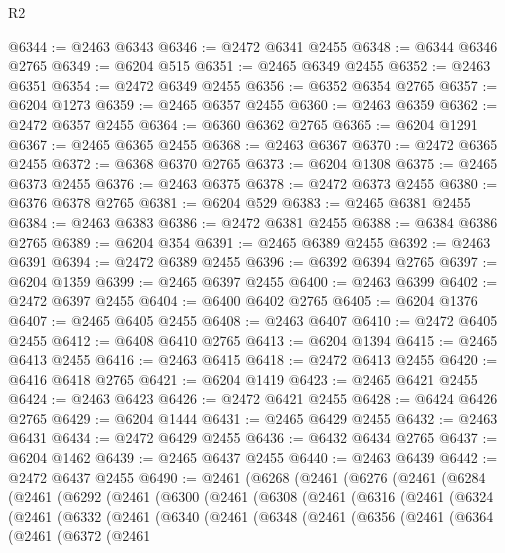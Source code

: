 \begin{lexlean}{R2}
\begin{coremodule}
@6344 := @2463 @6343
@6346 := @2472 @6341 @2455
@6348 := @6344 @6346 @2765
@6349 := @6204 @515
@6351 := @2465 @6349 @2455
@6352 := @2463 @6351
@6354 := @2472 @6349 @2455
@6356 := @6352 @6354 @2765
@6357 := @6204 @1273
@6359 := @2465 @6357 @2455
@6360 := @2463 @6359
@6362 := @2472 @6357 @2455
@6364 := @6360 @6362 @2765
@6365 := @6204 @1291
@6367 := @2465 @6365 @2455
@6368 := @2463 @6367
@6370 := @2472 @6365 @2455
@6372 := @6368 @6370 @2765
@6373 := @6204 @1308
@6375 := @2465 @6373 @2455
@6376 := @2463 @6375
@6378 := @2472 @6373 @2455
@6380 := @6376 @6378 @2765
@6381 := @6204 @529
@6383 := @2465 @6381 @2455
@6384 := @2463 @6383
@6386 := @2472 @6381 @2455
@6388 := @6384 @6386 @2765
@6389 := @6204 @354
@6391 := @2465 @6389 @2455
@6392 := @2463 @6391
@6394 := @2472 @6389 @2455
@6396 := @6392 @6394 @2765
@6397 := @6204 @1359
@6399 := @2465 @6397 @2455
@6400 := @2463 @6399
@6402 := @2472 @6397 @2455
@6404 := @6400 @6402 @2765
@6405 := @6204 @1376
@6407 := @2465 @6405 @2455
@6408 := @2463 @6407
@6410 := @2472 @6405 @2455
@6412 := @6408 @6410 @2765
@6413 := @6204 @1394
@6415 := @2465 @6413 @2455
@6416 := @2463 @6415
@6418 := @2472 @6413 @2455
@6420 := @6416 @6418 @2765
@6421 := @6204 @1419
@6423 := @2465 @6421 @2455
@6424 := @2463 @6423
@6426 := @2472 @6421 @2455
@6428 := @6424 @6426 @2765
@6429 := @6204 @1444
@6431 := @2465 @6429 @2455
@6432 := @2463 @6431
@6434 := @2472 @6429 @2455
@6436 := @6432 @6434 @2765
@6437 := @6204 @1462
@6439 := @2465 @6437 @2455
@6440 := @2463 @6439
@6442 := @2472 @6437 @2455
@6490 := @2461
    (@6268
      (@2461
        (@6276
          (@2461
            (@6284
              (@2461
                (@6292
                  (@2461
                    (@6300
                      (@2461
                        (@6308
                          (@2461
                            (@6316
                              (@2461
                                (@6324
                                  (@2461
                                    (@6332
                                      (@2461
                                        (@6340
                                          (@2461
                                            (@6348
                                              (@2461
                                                (@6356
                                                  (@2461
                                                    (@6364
                                                      (@2461
                                                        (@6372
                                                          (@2461

\end{coremodule}
\end{lexlean}
